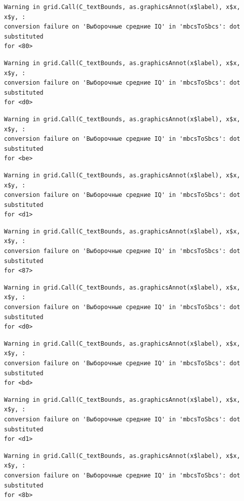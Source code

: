 \documentclass[
  letterpaper,
]{scrbook}
\theoremstyle{definition}
\theoremstyle{remark}
\begin{document}
\begin{verbatim}
Warning in grid.Call(C_textBounds, as.graphicsAnnot(x$label), x$x, x$y, :
conversion failure on 'Выборочные средние IQ' in 'mbcsToSbcs': dot substituted
for <80>
\end{verbatim}

\begin{verbatim}
Warning in grid.Call(C_textBounds, as.graphicsAnnot(x$label), x$x, x$y, :
conversion failure on 'Выборочные средние IQ' in 'mbcsToSbcs': dot substituted
for <d0>
\end{verbatim}

\begin{verbatim}
Warning in grid.Call(C_textBounds, as.graphicsAnnot(x$label), x$x, x$y, :
conversion failure on 'Выборочные средние IQ' in 'mbcsToSbcs': dot substituted
for <be>
\end{verbatim}

\begin{verbatim}
Warning in grid.Call(C_textBounds, as.graphicsAnnot(x$label), x$x, x$y, :
conversion failure on 'Выборочные средние IQ' in 'mbcsToSbcs': dot substituted
for <d1>
\end{verbatim}

\begin{verbatim}
Warning in grid.Call(C_textBounds, as.graphicsAnnot(x$label), x$x, x$y, :
conversion failure on 'Выборочные средние IQ' in 'mbcsToSbcs': dot substituted
for <87>
\end{verbatim}

\begin{verbatim}
Warning in grid.Call(C_textBounds, as.graphicsAnnot(x$label), x$x, x$y, :
conversion failure on 'Выборочные средние IQ' in 'mbcsToSbcs': dot substituted
for <d0>
\end{verbatim}

\begin{verbatim}
Warning in grid.Call(C_textBounds, as.graphicsAnnot(x$label), x$x, x$y, :
conversion failure on 'Выборочные средние IQ' in 'mbcsToSbcs': dot substituted
for <bd>
\end{verbatim}

\begin{verbatim}
Warning in grid.Call(C_textBounds, as.graphicsAnnot(x$label), x$x, x$y, :
conversion failure on 'Выборочные средние IQ' in 'mbcsToSbcs': dot substituted
for <d1>
\end{verbatim}

\begin{verbatim}
Warning in grid.Call(C_textBounds, as.graphicsAnnot(x$label), x$x, x$y, :
conversion failure on 'Выборочные средние IQ' in 'mbcsToSbcs': dot substituted
for <8b>
\end{verbatim}
\end{document}
